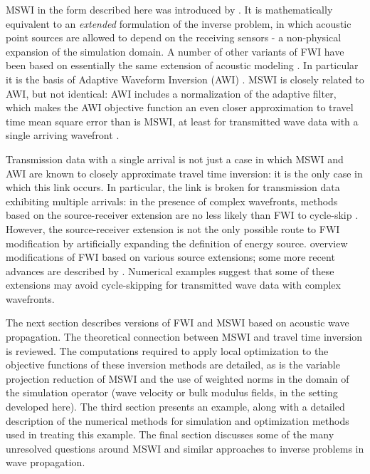 MSWI in the form described here was introduced by
\cite{HuangSymes2015SEG,HuangSymes:Geo17}. It is mathematically
equivalent to an {\em extended} formulation of the inverse problem, in
which acoustic point sources are allowed to depend on the receiving
sensors - a non-physical expansion of the simulation domain. A number
of other variants of FWI have been based on essentially the same
extension of acoustic modeling
\cite[]{Song:94c,Symes:94c,Plessix:00,LuoSava:11,LiAlkhalifah:21}. In
particular it is the basis of Adaptive Waveform Inversion (AWI) \cite[]{Warner:16,
  GuaschWarnerRavaut:GEO19,Warneretal:SEG21, Guaschetal:NPJDM20}. MSWI
is closely related to AWI, but not identical: AWI includes a
normalization of the adaptive filter, which makes the AWI objective
function an even closer approximation to travel time mean square error
than is MSWI, at least for transmitted wave data with a single
arriving wavefront \cite[]{Symes:24a}.

Transmission data with a single arrival is not just a case in which
MSWI and AWI are known to closely approximate travel time inversion:
it is the only case in which this link occurs. In particular, the link
is broken for transmission data exhibiting multiple arrivals: in the
presence of complex wavefronts, methods based on the source-receiver
extension are no less likely than FWI to cycle-skip
\cite[]{Symes:94c,HuangSymes:Geo17,Symes:24a}. However, the
source-receiver extension is not the only possible route to FWI
modification by artificially expanding the definition of energy
source. \cite{HuangNammourSymesDollizal:SEG19} overview modifications
of FWI based on various source extensions; some more recent advances
are described by
\cite{MetivierBrossier:SEG20,PladysBrossierLiMetivier:GEO21,LiAlkhalifah:21,Yongetal:GJI23,Opertoetal:GEO23}.
Numerical examples suggest that some of these extensions may avoid
cycle-skipping for transmitted wave data with complex wavefronts.

The next section describes versions of FWI and MSWI based on
acoustic wave propagation. The theoretical connection between MSWI and
travel time inversion is reviewed. The computations required to apply local
optimization to the objective functions of these inversion methods are
detailed, as is the variable projection reduction of MSWI and the use
of weighted norms in the domain of the simulation operator (wave
velocity or bulk modulus fields, in the setting developed here). The
third section presents an example, along with a detailed description
of the numerical methods for simulation and optimization methods used
in treating this example. The final section discusses some of the many
unresolved questions around MSWI and similar approaches to inverse
problems in wave propagation.

